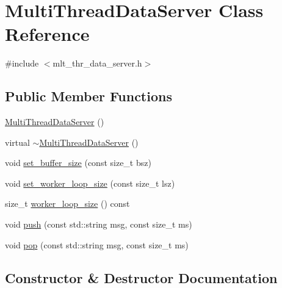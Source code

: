 \hypertarget{classMultiThreadDataServer}{}\section{Multi\+Thread\+Data\+Server Class Reference}
\label{classMultiThreadDataServer}


{\ttfamily \#include $<$mlt\+\_\+thr\+\_\+data\+\_\+server.\+h$>$}

\subsection*{Public Member Functions}
\begin{DoxyCompactItemize}
\item 
\hyperlink{classMultiThreadDataServer_a614668c4111e4c4c65d86847d7ce448a}{Multi\+Thread\+Data\+Server} ()
\item 
virtual \hyperlink{classMultiThreadDataServer_a2f8821939b088372702fc5282d9c7d56}{$\sim$\+Multi\+Thread\+Data\+Server} ()
\item 
void \hyperlink{classMultiThreadDataServer_a6e347641cb63e8bce6d65d74c37849a7}{set\+\_\+buffer\+\_\+size} (const size\+\_\+t bsz)
\item 
void \hyperlink{classMultiThreadDataServer_a76eccc6978541af924a14f03d9d5b556}{set\+\_\+worker\+\_\+loop\+\_\+size} (const size\+\_\+t lsz)
\item 
size\+\_\+t \hyperlink{classMultiThreadDataServer_a86df4d28e4f35206b67a9c4e20b98649}{worker\+\_\+loop\+\_\+size} () const 
\item 
void \hyperlink{classMultiThreadDataServer_a46f7d9884de27f9a5427ea7a6b950c0a}{push} (const std\+::string msg, const size\+\_\+t ms)
\item 
void \hyperlink{classMultiThreadDataServer_a6b6020d24aec2aff2bbf8ed9420c0f91}{pop} (const std\+::string msg, const size\+\_\+t ms)
\end{DoxyCompactItemize}


\subsection{Constructor \& Destructor Documentation}
